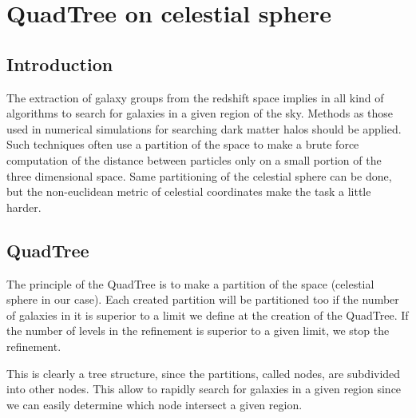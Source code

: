 \chapter{QuadTree on celestial sphere}\label{sec:quadtree}
%
%
\section{Introduction}
%
The extraction of galaxy groups from the redshift space implies in all kind
of algorithms to search for galaxies in a given region of the sky. Methods
as those used in numerical simulations for searching dark matter halos
should be applied. Such techniques often use a partition of the space to
make a brute force computation of the distance between particles only on a
small portion of the three dimensional space. Same partitioning of the
celestial sphere can be done, but the non-euclidean metric of celestial
coordinates make the task a little harder.
%
\section{QuadTree}
%
The principle of the QuadTree is to make a partition of the space (celestial
sphere in our case). Each created partition will be partitioned too if the
number of galaxies in it is superior to a limit we define at the creation of
the QuadTree. If the number of levels in the refinement is superior to a
given limit, we stop the refinement.

This is clearly a tree structure, since the partitions, called nodes, are
subdivided into other nodes. This allow to rapidly search for galaxies in a
given region since we can easily determine which node intersect a given
region.
%
